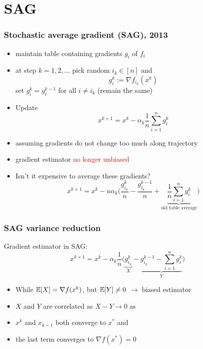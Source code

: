 \documentclass{beamer}
\begin{document}
\section{SAG}%
\label{sec:}

\begin{frame}
  \frametitle{Stochastic average gradient (SAG), 2013}
  \begin{itemize}
    \item maintain table containing gradients $g_i$ of $f_i$
    \item at step $k = 1,2, \dots$ pick random $i_k \in [n]$ and
          \begin{equation}
            g_i^k := \nabla f_{i_k}(x^{k})
          \end{equation}
          set $g_{i}^k = g_i^{k-1}$ for all $i\neq i_k$ (remain the same)
    \item Update
          \begin{equation}
            x^{k+1} = x^k - \alpha_k \frac{1}{n} \sum_{i=1}^{n} g_i^k
          \end{equation}
    \item assuming gradients do not change too much along trajectory
    \item gradient estimator \textcolor{red}{no longer unbiased}
    \item Isn't it expensive to average these gradients?
          \begin{equation}
            x^{k+1} = x^k -u \alpha_k  \Big( \frac{g_{i_k}^k}{n} - \frac{g_{i_k}^{k-1}}{n} + \underbrace{\frac{1}{n}\sum_{i=1}^{n} g_i^k}_{\text{old table average}} \Big)
          \end{equation}
  \end{itemize}
\end{frame}


\begin{frame}
  \frametitle{SAG variance reduction}
  Gradient estimator in SAG:
  \begin{equation}
    x^{k+1} = x^k - \alpha_k \frac{1}{n} \Big( \underbrace{g_{i_k}^k}_X - \underbrace{g_{i_k}^{k-1} - \sum_{i=1}^{n} g_i^k}_{Y} \Big)
  \end{equation}
  \begin{itemize}
    \item While $\mathbb{E}[X] = \nabla f(x^k)$, but $\mathbb{E}[Y]\neq 0$ $\rightarrow $ biased estimator
    \item $X$ and $Y$ are correlated as $X-Y \to 0$  as
    \item $x^k$ and $x_{k-1}$ both converge to $x^*$ and
    \item the last term converges to $\nabla f(x^*)= 0$
  \end{itemize}
\end{frame}
\end{document}
